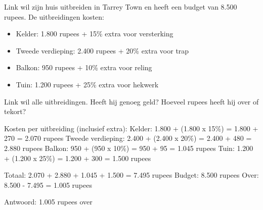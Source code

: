 \begin{opgave}
Link wil zijn huis uitbreiden in Tarrey Town en heeft een budget van 8.500 rupees.
De uitbreidingen kosten:

\begin{itemize}
\item Kelder: 1.800 rupees + 15\% extra voor versterking
\item Tweede verdieping: 2.400 rupees + 20\% extra voor trap
\item Balkon: 950 rupees + 10\% extra voor reling
\item Tuin: 1.200 rupees + 25\% extra voor hekwerk
\end{itemize}

Link wil alle uitbreidingen. Heeft hij genoeg geld? Hoeveel rupees heeft hij
over of tekort?
\end{opgave}

\begin{oplossing}
Kosten per uitbreiding (inclusief extra):
Kelder: 1.800 + (1.800 x 15\%) = 1.800 + 270 = 2.070 rupees
Tweede verdieping: 2.400 + (2.400 x 20\%) = 2.400 + 480 = 2.880 rupees
Balkon: 950 + (950 x 10\%) = 950 + 95 = 1.045 rupees
Tuin: 1.200 + (1.200 x 25\%) = 1.200 + 300 = 1.500 rupees

Totaal: 2.070 + 2.880 + 1.045 + 1.500 = 7.495 rupees
Budget: 8.500 rupees
Over: 8.500 - 7.495 = 1.005 rupees

Antwoord: 1.005 rupees over
\end{oplossing}
